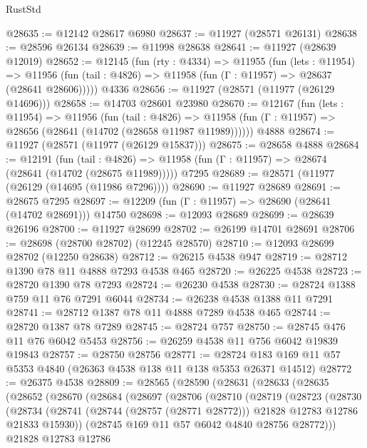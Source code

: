 \begin{lexlean}{RustStd}
\begin{coremodule}
@28635 := @12142 @28617 @6980
@28637 := @11927 (@28571 @26131)
@28638 := @28596 @26134
@28639 := @11998 @28638
@28641 := @11927 (@28639 @12019)
@28652 := @12145
    (fun (rty : @4334) =>
    @11955
      (fun (lets : @11954) =>
      @11956 (fun (tail : @4826) => @11958 (fun (Γ : @11957) => @28637 (@28641 @28606)))))
    @4336
@28656 := @11927 (@28571 (@11977 (@26129 @14696)))
@28658 := @14703 @28601 @23980
@28670 := @12167
    (fun (lets : @11954) =>
    @11956
      (fun (tail : @4826) =>
      @11958 (fun (Γ : @11957) => @28656 (@28641 (@14702 (@28658 @11987 @11989))))))
    @4888
@28674 := @11927 (@28571 (@11977 (@26129 @15837)))
@28675 := @28658 @4888
@28684 := @12191
    (fun (tail : @4826) => @11958 (fun (Γ : @11957) => @28674 (@28641 (@14702 (@28675 @11989)))))
    @7295
@28689 := @28571 (@11977 (@26129 (@14695 (@11986 @7296))))
@28690 := @11927 @28689
@28691 := @28675 @7295
@28697 := @12209 (fun (Γ : @11957) => @28690 (@28641 (@14702 @28691))) @14750
@28698 := @12093 @28689
@28699 := @28639 @26196
@28700 := @11927 @28699
@28702 := @26199 @14701 @28691
@28706 := @28698 (@28700 @28702) (@12245 @28570)
@28710 := @12093 @28699 @28702 (@12250 @28638)
@28712 := @26215 @4538 @947
@28719 := @28712 @1390 @78 @11 @4888 @7293 @4538 @465
@28720 := @26225 @4538
@28723 := @28720 @1390 @78 @7293
@28724 := @26230 @4538
@28730 := @28724 @1388 @759 @11 @76 @7291 @6044
@28734 := @26238 @4538 @1388 @11 @7291
@28741 := @28712 @1387 @78 @11 @4888 @7289 @4538 @465
@28744 := @28720 @1387 @78 @7289
@28745 := @28724 @757
@28750 := @28745 @476 @11 @76 @6042 @5453
@28756 := @26259 @4538 @11 @756 @6042 @19839 @19843
@28757 := @28750 @28756
@28771 := @28724 @183 @169 @11 @57 @5353 @4840 (@26363 @4538 @138 @11 @138 @5353 @26371 @14512)
@28772 := @26375 @4538
@28809 := @28565
    (@28590
      (@28631
        (@28633
          (@28635
            (@28652
              (@28670
                (@28684
                  (@28697
                    (@28706
                      (@28710
                        (@28719
                          (@28723
                            (@28730
                              (@28734
                                (@28741
                                  (@28744 (@28757 (@28771 @28772)))
                                  @21828
                                  @12783
                                  @12786
                                  @21833
                                  @15930))
                              (@28745 @169 @11 @57 @6042 @4840 @28756 @28772)))
                          @21828
                          @12783
                          @12786

\end{coremodule}
\end{lexlean}
